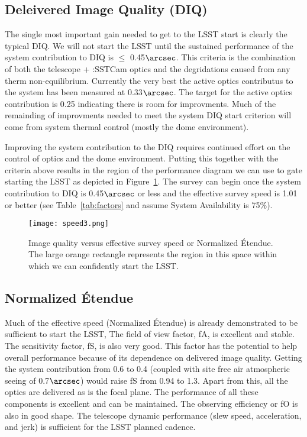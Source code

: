 \subsection{Deleivered Image Quality (DIQ)}

The single most important gain needed to get to the LSST start is clearly the typical DIQ.  We will not start the LSST until the sustained performance of the system contribution to DIQ is $\le$ 0.45$\arcsec$.  This criteria is the combination of both the telescope + :SSTCam optics and the degridations caused from any therm non-equilibrium. Currently the very best the active optics contributus to the system has been measured at 0.33$\arcsec$.  The target for the active optics contribution is 0.25 indicating there is room for improvments.  Much of the remainding of improvments needed to meet the system DIQ start criterion will come from system thermal control (mostly the dome environment).

Improving the system contribution to the DIQ requires continued effort on the control of optics and the dome environment. Putting this together with the criteria above results in the region of the performance diagram we can use to gate starting the LSST as depicted in Figure~\ref{speed3}. The survey can begin once the system contribution to DIQ is 0.45$\arcsec$ or less and the effective survey speed is 1.01 or better (see Table~\ref{tab:factors} and assume System Availability is 75$\%$).

\begin{figure}[t]
\centering
\texttt{[image: speed3.png]}
\caption{Image quality versus effective survey speed or Normalized \'{E}tendue. The large orange rectangle represents the region in this space within which we can confidently start the LSST.}
\label{speed3}
\end{figure}

\subsection{Normalized \'{E}tendue}
Much of the effective speed (Normalized  \'{E}tendue) is already demonstrated to be sufficient to start the LSST, The field of view factor, fA, is excellent and stable. The sensitivity factor, fS, is also very good. This factor has the potential to help overall performance because of its dependence on delivered image quality. Getting the system contribution from 0.6 to 0.4 (coupled with site free air atmospheric seeing of 0.7$\arcsec$) would raise fS from 0.94 to 1.3. Apart from this, all the optics are delivered as is the focal plane. The performance of all these components is excellent and can be maintained. The observing efficiency or fO is also in good shape. The telescope dynamic performance (slew speed, acceleration, and jerk) is sufficient for the LSST planned cadence. 

